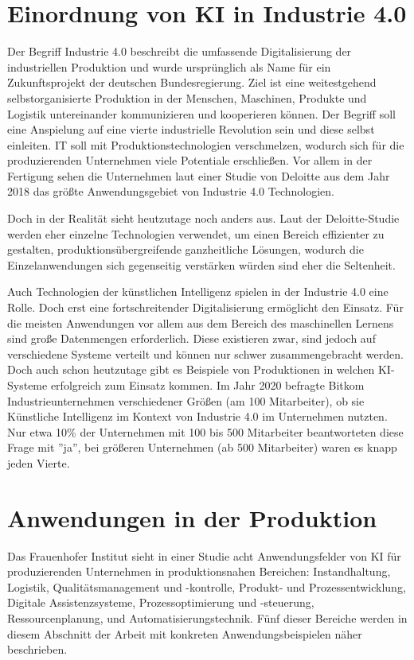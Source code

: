 \documentclass[a4paper,12pt, german]{report}
\begin{document}
\section{Einordnung von KI in Industrie 4.0}
Der Begriff Industrie 4.0 beschreibt die umfassende Digitalisierung der industriellen Produktion und wurde ursprünglich als Name für ein Zukunftsprojekt der deutschen Bundesregierung. Ziel ist eine weitestgehend selbstorganisierte Produktion in der Menschen, Maschinen, Produkte und Logistik untereinander kommunizieren und kooperieren können. Der Begriff soll eine Anspielung auf eine vierte industrielle Revolution sein und diese selbst einleiten. IT soll mit Produktionstechnologien verschmelzen, wodurch sich für die produzierenden Unternehmen viele Potentiale erschließen. \cite{22}Vor allem in der Fertigung sehen die Unternehmen laut einer Studie von Deloitte aus dem Jahr 2018 das größte Anwendungsgebiet von Industrie 4.0 Technologien.\cite{23}


Doch in der Realität sieht heutzutage noch anders aus. Laut der Deloitte-Studie werden eher einzelne Technologien verwendet, um einen Bereich effizienter zu gestalten, produktionsübergreifende ganzheitliche Lösungen, wodurch die Einzelanwendungen sich gegenseitig verstärken würden sind eher die Seltenheit.

Auch Technologien der künstlichen Intelligenz spielen in der Industrie 4.0 eine Rolle. Doch erst eine fortschreitender Digitalisierung ermöglicht den Einsatz. Für die meisten Anwendungen vor allem aus dem Bereich des maschinellen Lernens sind große Datenmengen erforderlich. Diese existieren zwar, sind jedoch auf verschiedene Systeme verteilt und können nur schwer zusammengebracht werden. Doch auch schon heutzutage gibt es Beispiele von Produktionen in welchen KI-Systeme erfolgreich zum Einsatz kommen. Im Jahr 2020 befragte Bitkom Industrieunternehmen verschiedener Größen (am 100 Mitarbeiter), ob sie Künstliche Intelligenz im Kontext von Industrie 4.0 im Unternehmen nutzten. Nur etwa 10\% der Unternehmen mit 100 bis 500 Mitarbeiter beantworteten diese Frage mit ''ja'', bei größeren Unternehmen (ab 500 Mitarbeiter) waren es knapp jeden Vierte.\cite{27} 
 
\section{Anwendungen in der Produktion}
Das Frauenhofer Institut sieht in einer Studie acht Anwendungsfelder von KI für produzierenden Unternehmen in produktionsnahen Bereichen: Instandhaltung, Logistik, Qualitätsmanagement und -kontrolle, Produkt- und Prozessentwicklung, Digitale Assistenzsysteme, Prozessoptimierung und -steuerung, Ressourcenplanung, und Automatisierungstechnik.\cite{24} Fünf dieser Bereiche werden in diesem Abschnitt der Arbeit mit konkreten Anwendungsbeispielen näher beschrieben.
\end{document}
